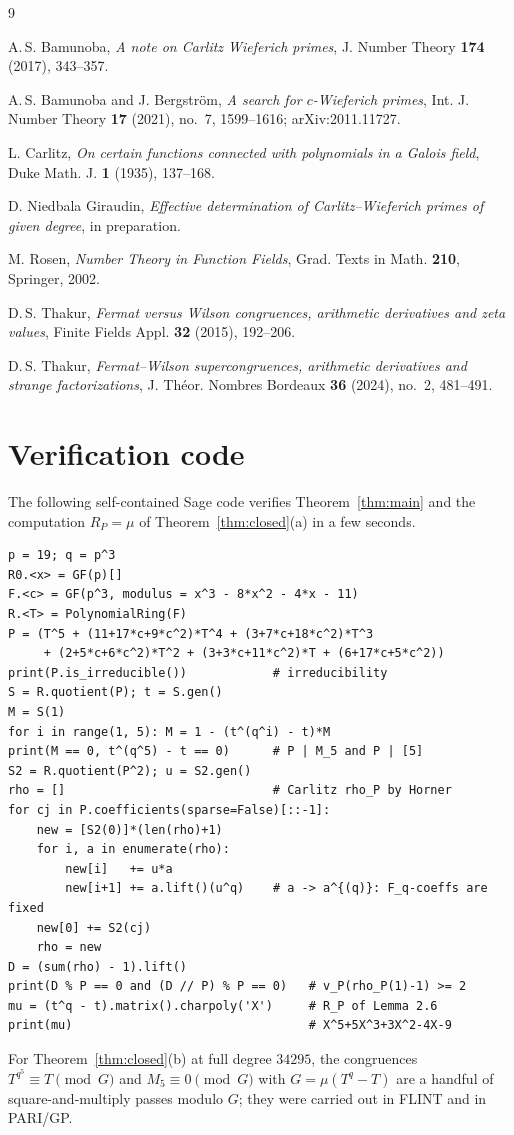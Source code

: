 \documentclass[11pt]{amsart}
\theoremstyle{plain}
\theoremstyle{definition}
\begin{document}
\begin{thebibliography}{9}

 A.\,S. Bamunoba,
\emph{A note on Carlitz Wieferich primes},
J. Number Theory \textbf{174} (2017), 343--357.

 A.\,S. Bamunoba and J. Bergstr\"om,
\emph{A search for $c$-Wieferich primes},
Int. J. Number Theory \textbf{17} (2021), no.~7, 1599--1616; arXiv:2011.11727.

 L. Carlitz,
\emph{On certain functions connected with polynomials in a Galois field},
Duke Math. J. \textbf{1} (1935), 137--168.

 D. Niedbala Giraudin,
\emph{Effective determination of Carlitz--Wieferich primes of given degree},
in preparation.

 M. Rosen,
\emph{Number Theory in Function Fields},
Grad. Texts in Math. \textbf{210}, Springer, 2002.

 D.\,S. Thakur,
\emph{Fermat versus Wilson congruences, arithmetic derivatives and zeta
values},
Finite Fields Appl. \textbf{32} (2015), 192--206.

 D.\,S. Thakur,
\emph{Fermat--Wilson supercongruences, arithmetic derivatives and strange
factorizations},
J. Th\'eor. Nombres Bordeaux \textbf{36} (2024), no.~2, 481--491.

\end{thebibliography}

\appendix
\section{Verification code}

The following self-contained Sage code verifies Theorem~\ref{thm:main} and the
computation $R_P=\mu$ of Theorem~\ref{thm:closed}(a) in a few seconds.

\begin{verbatim}
p = 19; q = p^3
R0.<x> = GF(p)[]
F.<c> = GF(p^3, modulus = x^3 - 8*x^2 - 4*x - 11)
R.<T> = PolynomialRing(F)
P = (T^5 + (11+17*c+9*c^2)*T^4 + (3+7*c+18*c^2)*T^3
     + (2+5*c+6*c^2)*T^2 + (3+3*c+11*c^2)*T + (6+17*c+5*c^2))
print(P.is_irreducible())            # irreducibility
S = R.quotient(P); t = S.gen()
M = S(1)
for i in range(1, 5): M = 1 - (t^(q^i) - t)*M
print(M == 0, t^(q^5) - t == 0)      # P | M_5 and P | [5]
S2 = R.quotient(P^2); u = S2.gen()
rho = []                             # Carlitz rho_P by Horner
for cj in P.coefficients(sparse=False)[::-1]:
    new = [S2(0)]*(len(rho)+1)
    for i, a in enumerate(rho):
        new[i]   += u*a
        new[i+1] += a.lift()(u^q)    # a -> a^{(q)}: F_q-coeffs are fixed
    new[0] += S2(cj)
    rho = new
D = (sum(rho) - 1).lift()
print(D % P == 0 and (D // P) % P == 0)   # v_P(rho_P(1)-1) >= 2
mu = (t^q - t).matrix().charpoly('X')     # R_P of Lemma 2.6
print(mu)                                 # X^5+5X^3+3X^2-4X-9
\end{verbatim}

For Theorem~\ref{thm:closed}(b) at full degree $34295$, the congruences
$T^{q^5}\equiv T\pmod G$ and $M_5\equiv0\pmod G$ with $G=\mu(T^q-T)$ are a
handful of square-and-multiply passes modulo $G$; they were carried out in
FLINT and in PARI/GP.
\end{document}
